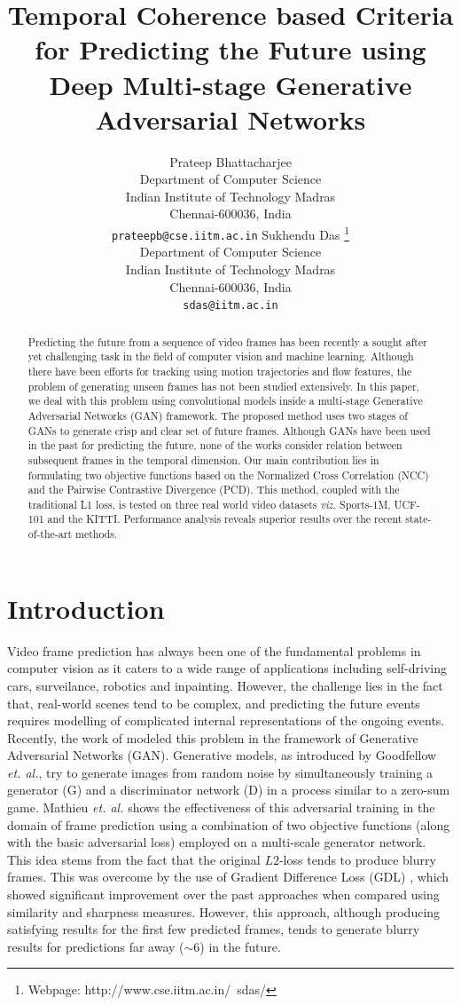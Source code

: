 \documentclass{article}
\title{Temporal Coherence based Criteria for Predicting the Future using Deep Multi-stage Generative Adversarial Networks}
\author{
  Prateep Bhattacharjee \\
  Department of Computer Science\\
  Indian Institute of Technology Madras\\
  Chennai-600036, India \\
  \texttt{prateepb@cse.iitm.ac.in}
   \And
   Sukhendu Das \thanks{Webpage: http://www.cse.iitm.ac.in/~sdas/} \\
   Department of Computer Science\\
   Indian Institute of Technology Madras \\
   Chennai-600036, India \\
   \texttt{sdas@iitm.ac.in} \\
}
\begin{document}

\maketitle

\begin{abstract}
  Predicting the future from a sequence of video frames has been recently a sought after yet challenging task in the field of computer vision and machine learning. Although there have been efforts for tracking using motion trajectories and flow features, the problem of generating unseen frames has not been studied extensively. In this paper, we deal with this problem using convolutional models inside a multi-stage Generative Adversarial Networks (GAN) framework.
  The proposed method uses two stages of GANs to generate crisp and clear set of future frames. Although GANs have been used in the past for predicting the future, none of the works consider relation between subsequent frames in the temporal dimension. Our main contribution lies in formulating two objective functions based on the Normalized Cross Correlation (NCC) and the Pairwise Contrastive Divergence (PCD). This method, coupled with the traditional L1 loss, is tested on three real world video datasets \textit{viz.} Sports-1M, UCF-101 and the KITTI. Performance analysis reveals superior results over the recent state-of-the-art methods.
\end{abstract}

\section{Introduction}
  Video frame prediction has always been one of the fundamental problems in computer vision as it caters to a wide range of applications including self-driving cars, surveilance, robotics and inpainting. However, the challenge lies in the fact that, real-world scenes tend to be complex, and predicting the future events requires modelling of complicated internal representations of the ongoing events. Recently, the work of \cite{mathieu2015deep} modeled this problem in the framework of Generative Adversarial Networks (GAN). Generative models, as introduced by Goodfellow \textit{et. al.}, \cite{goodfellow2014generative} try to generate images from random noise by simultaneously training a generator (G) and a discriminator network (D) in a process similar to a zero-sum game. Mathieu \textit{et. al.} \cite{mathieu2015deep} shows the effectiveness of this adversarial training in the domain of frame prediction using a combination of two objective functions (along with the basic adversarial loss) employed on a multi-scale generator network. This idea stems from the fact that the original $ L2 $-loss tends to produce blurry frames. This was overcome by the use of Gradient Difference Loss (GDL) \cite{mathieu2015deep}, which showed significant improvement over the past approaches when compared using similarity and sharpness measures. However, this approach, although producing satisfying results for the first few predicted frames, tends to generate blurry results for predictions far away ($ \sim $6) in the future. 
  
\end{document}
